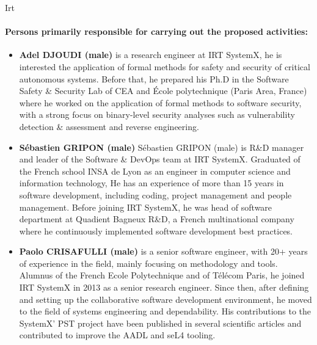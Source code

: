 \begin{sitedescription}{Irt}
\paragraph{Persons primarily responsible for carrying out the proposed activities:}

\begin{itemize} %

\item{\bf Adel DJOUDI (male)} is a research engineer at IRT SystemX, he is interested the application of formal methods for safety and security of critical autonomous systems. Before that, he prepared his Ph.D in the Software Safety \& Security Lab of CEA and École polytechnique (Paris Area, France) where he worked on the application of formal methods to software security, with a strong focus on binary-level security analyses such as vulnerability detection \& assessment and reverse engineering.
\item{\bf Sébastien GRIPON (male)} Sébastien GRIPON (male) is R\&D manager and leader of the Software \& DevOps team at IRT SystemX. Graduated of the French school INSA de Lyon as an engineer in computer science and information technology, He has an experience of more than 15 years in software development, including coding, project management and people management. Before joining IRT SystemX, he was head of software department at Quadient Bagneux R\&D, a French multinational company where he continuously implemented software development best practices.
\item{\bf Paolo CRISAFULLI (male)} is a senior software engineer, with 20+ years of experience in the field, mainly focusing on methodology and tools. Alumnus of the French Ecole Polytechnique and of Télécom Paris, he joined IRT SystemX in 2013 as a senior research engineer. Since then, after defining and setting up the collaborative software development environment, he moved to the field of systems engineering and dependability. His contributions to the SystemX’ PST project have been published in several scientific articles and contributed to improve the AADL and seL4 tooling.

\end{itemize}

\end{sitedescription}

